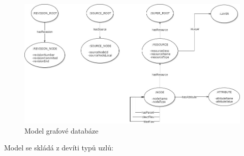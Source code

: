 
\begin{figure}
\begin{center}
\includegraphics[width=14cm]{figures/model}
\caption{Model grafové databáze}
\label{fig:ana-model}
\end{center}
\end{figure}

Model se skládá z devíti typů uzlů:

